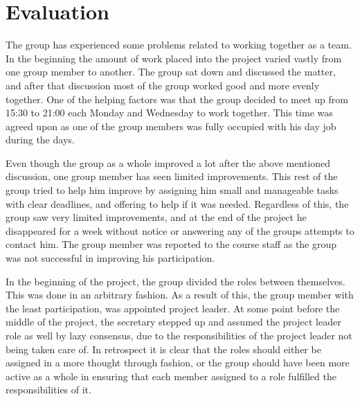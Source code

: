 \documentclass[11pt]{article}
\begin{document}
\begin{titlepage}
\begin{center}
        
    \end{center}
        
\end{titlepage}

\color{black}


\section{Evaluation}
The group has experienced some problems related to working together as a team. In the beginning the amount of work placed into the project varied vastly from one group member to another. The group sat down and discussed the matter, and after that discussion most of the group worked good and more evenly together. One of the helping factors was that the group decided to meet up from 15:30 to 21:00 each Monday and Wednesday to work together. This time was agreed upon as one of the group members was fully occupied with his day job during the days.

Even though the group as a whole improved a lot after the above mentioned discussion, one group member has seen limited improvements. This rest of the group tried to help him improve by assigning him small and manageable tasks with clear deadlines, and offering to help if it was needed. Regardless of this, the group saw very limited improvements, and at the end of the project he disappeared for a week without notice or answering any of the groups attempts to contact him. The group member was reported to the course staff as the group was not successful in improving his participation.

In the beginning of the project, the group divided the roles between themselves. This was done in an arbitrary fashion. As a result of this, the group member with the least participation, was appointed project leader. At some point before the middle of the project, the secretary stepped up and assumed the project leader role as well by lazy consensus, due to the responsibilities of the project leader not being taken care of. In retrospect it is clear that the roles should either be assigned in a more thought through fashion, or the group should have been more active as a whole in ensuring that each member assigned to a role fulfilled the responsibilities of it.
\end{document}
